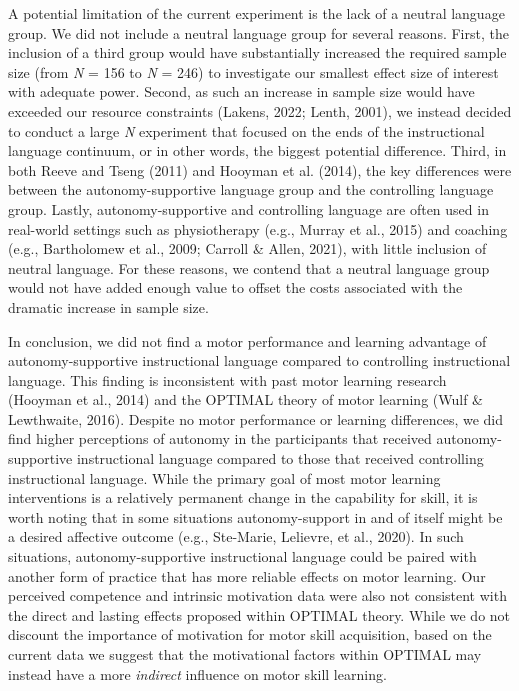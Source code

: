 \documentclass[
  doc, donotrepeattitle,floatsintext]{apa7}
\begin{document}
A potential limitation of the current experiment is the lack of a neutral language group. We did not include a neutral language group for several reasons. First, the inclusion of a third group would have substantially increased the required sample size (from \emph{N} = 156 to \emph{N} = 246) to investigate our smallest effect size of interest with adequate power. Second, as such an increase in sample size would have exceeded our resource constraints (Lakens, 2022; Lenth, 2001), we instead decided to conduct a large \emph{N} experiment that focused on the ends of the instructional language continuum, or in other words, the biggest potential difference. Third, in both Reeve and Tseng (2011) and Hooyman et al. (2014), the key differences were between the autonomy-supportive language group and the controlling language group. Lastly, autonomy-supportive and controlling language are often used in real-world settings such as physiotherapy (e.g., Murray et al., 2015) and coaching (e.g., Bartholomew et al., 2009; Carroll \& Allen, 2021), with little inclusion of neutral language. For these reasons, we contend that a neutral language group would not have added enough value to offset the costs associated with the dramatic increase in sample size.

In conclusion, we did not find a motor performance and learning advantage of autonomy-supportive instructional language compared to controlling instructional language. This finding is inconsistent with past motor learning research (Hooyman et al., 2014) and the OPTIMAL theory of motor learning (Wulf \& Lewthwaite, 2016). Despite no motor performance or learning differences, we did find higher perceptions of autonomy in the participants that received autonomy-supportive instructional language compared to those that received controlling instructional language. While the primary goal of most motor learning interventions is a relatively permanent change in the capability for skill, it is worth noting that in some situations autonomy-support in and of itself might be a desired affective outcome (e.g., Ste-Marie, Lelievre, et al., 2020). In such situations, autonomy-supportive instructional language could be paired with another form of practice that has more reliable effects on motor learning. Our perceived competence and intrinsic motivation data were also not consistent with the direct and lasting effects proposed within OPTIMAL theory. While we do not discount the importance of motivation for motor skill acquisition, based on the current data we suggest that the motivational factors within OPTIMAL may instead have a more \emph{indirect} influence on motor skill learning.
\end{document}

